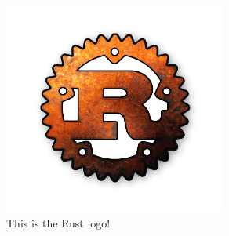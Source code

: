 \documentclass[a4paper,11pt]{article}
\begin{document}
\begin{figure}
	\includegraphics[scale=1]{rust_logo.jpg}
	\caption{This is the Rust logo!}
\end{figure}
\end{document}
